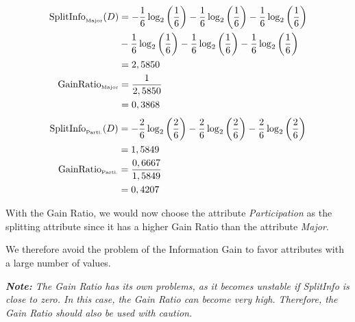 \documentclass[
english,
smallborders
]{i6prcsht}
\newcommand{\OfAttribute}[1]{_{\text{\tiny #1}}}
\begin{document}
\begin{solution}
	\begin{alignat*}{2}
		\text{SplitInfo}\OfAttribute{Major}(D) & = -\frac{1}{6} \log_2\left(\frac{1}{6}\right) - \frac{1}{6} \log_2\left(\frac{1}{6}\right) - \frac{1}{6} \log_2\left(\frac{1}{6}\right) \\
		                                       & - \frac{1}{6} \log_2\left(\frac{1}{6}\right) - \frac{1}{6} \log_2\left(\frac{1}{6}\right) - \frac{1}{6} \log_2\left(\frac{1}{6}\right)  \\
		                                       & = 2,5850                                                                                                                                \\
		\text{GainRatio}\OfAttribute{Major}    & = \frac{1}{2,5850}                                                                                                                      \\
		                                       & = 0,3868                                                                                                                                \\
	\end{alignat*}
	\begin{alignat*}{2}
		\text{SplitInfo}\OfAttribute{Parti.}(D) & = -\frac{2}{6} \log_2\left(\frac{2}{6}\right) - \frac{2}{6} \log_2\left(\frac{2}{6}\right) - \frac{2}{6} \log_2\left(\frac{2}{6}\right) \\
		                                        & = 1,5849                                                                                                                                \\
		\text{GainRatio}\OfAttribute{Parti.}    & = \frac{0,6667}{1,5849}                                                                                                                 \\
		                                        & = 0,4207                                                                                                                                \\
	\end{alignat*}

	With the Gain Ratio, we would now choose the attribute \textit{Participation} as the splitting attribute since it has a higher Gain Ratio than the attribute \textit{Major}.

	We therefore avoid the problem of the Information Gain to favor attributes with a large number of values.

	\textit{\textbf{Note:} The Gain Ratio has its own problems, as it becomes unstable if SplitInfo is close to zero. In this case, the Gain Ratio can become very high. Therefore, the Gain Ratio should also be used with caution.}

\end{solution}
\end{document}
